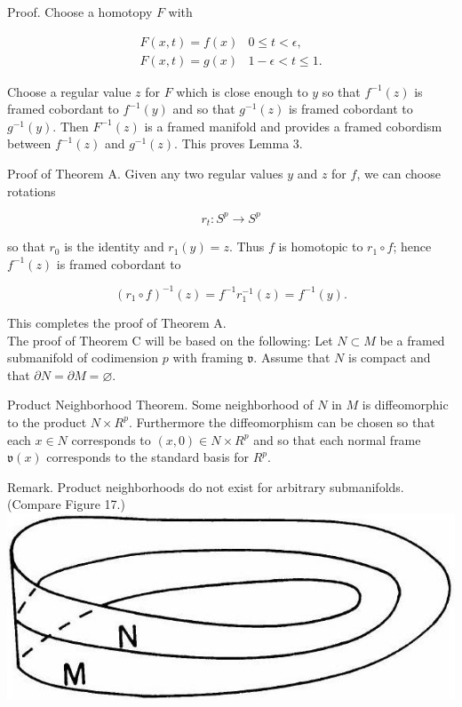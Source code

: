 \documentclass[10pt, letterpaper]{article}
\begin{document}
Proof. Choose a homotopy $F$ with

$$
\begin{array}{ll}
F(x, t)=f(x) & 0 \leq t<\epsilon, \\
F(x, t)=g(x) & 1-\epsilon<t \leq 1 .
\end{array}
$$

Choose a regular value $z$ for $F$ which is close enough to $y$ so that $f^{-1}(z)$ is framed cobordant to $f^{-1}(y)$ and so that $g^{-1}(z)$ is framed cobordant to $g^{-1}(y)$. Then $F^{-1}(z)$ is a framed manifold and provides a framed cobordism between $f^{-1}(z)$ and $g^{-1}(z)$. This proves Lemma 3.

Proof of Theorem A. Given any two regular values $y$ and $z$ for $f$, we can choose rotations

$$
r_{t}: S^{p} \rightarrow S^{p}
$$

so that $r_{0}$ is the identity and $r_{1}(y)=z$. Thus $f$ is homotopic to $r_{1} \circ f$; hence $f^{-1}(z)$ is framed cobordant to

$$
\left(r_{1} \circ f\right)^{-1}(z)=f^{-1} r_{1}^{-1}(z)=f^{-1}(y) .
$$

This completes the proof of Theorem A.\\
The proof of Theorem C will be based on the following: Let $N \subset M$ be a framed submanifold of codimension $p$ with framing $\mathfrak{v}$. Assume that $N$ is compact and that $\partial N=\partial M=\varnothing$.

Product Neighborhood Theorem. Some neighborhood of $N$ in $M$ is diffeomorphic to the product $N \times R^{p}$. Furthermore the diffeomorphism can be chosen so that each $x \in N$ corresponds to $(x, 0) \in N \times R^{p}$ and so that each normal frame $\mathfrak{v}(x)$ corresponds to the standard basis for $R^{p}$.

Remark. Product neighborhoods do not exist for arbitrary submanifolds. (Compare Figure 17.)\\
\includegraphics[scale=0.2, center]{2025_05_28_7c9927389b272ddbc2c3g-57}
\end{document}
